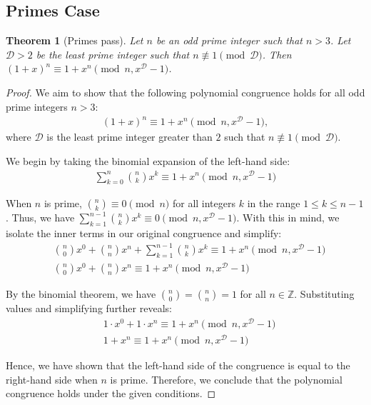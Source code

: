 \documentclass{article}
\theoremstyle{plain}
\theoremstyle{definition}
\newtheorem{theorem}{Theorem}
\newcommand{\D}{\mathcal{D}}
\begin{document}
\subsection{Primes Case}
\begin{theorem}[Primes pass] \label{theorem:primes}
\textit{Let $n$ be an odd prime integer such that $n > 3$. Let $\D > 2$ be the least prime integer such that $n \not\equiv 1 \pmod{\D}$. Then $(1 + x)^n \equiv 1 + x^n \pmod{n, x^\D - 1}$.}
\end{theorem}
\begin{proof}
We aim to show that the following polynomial congruence holds for all odd prime integers $n > 3$:
\begin{align}
    (1 + x)^n \equiv 1 + x^n \pmod{n, x^\D - 1},
\end{align}
where $\D$ is the least prime integer greater than $2$ such that $n \not\equiv 1 \pmod{\D}$.

We begin by taking the binomial expansion of the left-hand side:
\begin{align}
    \sum_{k=0}^{n} \binom{n}{k} x^k \equiv 1 + x^n \pmod{n, x^\D - 1}
\end{align}

When $n$ is prime, $\binom{n}{k} \equiv 0 \pmod{n}$ for all integers $k$ in the range $1 \leq k \leq n-1$. Thus, we have $\sum_{k=1}^{n-1} \binom{n}{k} x^k \equiv 0 \pmod{n, x^\D - 1}$. With this in mind, we isolate the inner terms in our original congruence and simplify:
\begin{align}
    & \binom{n}{0} x^0 + \binom{n}{n} x^n + \sum_{k=1}^{n-1} \binom{n}{k} x^k \equiv 1 + x^n \pmod{n, x^\D - 1} \\
    & \binom{n}{0} x^0 + \binom{n}{n} x^n \equiv 1 + x^n \pmod{n, x^\D - 1}
\end{align}

By the binomial theorem, we have $\binom{n}{0} = \binom{n}{n} = 1$ for all $n \in \mathbb{Z}$. Substituting values and simplifying further reveals:
\begin{align}
    & 1 \cdot x^0 + 1 \cdot x^n \equiv 1 + x^n \pmod{n, x^\D - 1} \\
    & 1 + x^n \equiv 1 + x^n \pmod{n, x^\D - 1}
\end{align}

Hence, we have shown that the left-hand side of the congruence is equal to the right-hand side when $n$ is prime. Therefore, we conclude that the polynomial congruence holds under the given conditions.
\end{proof}
\end{document}
